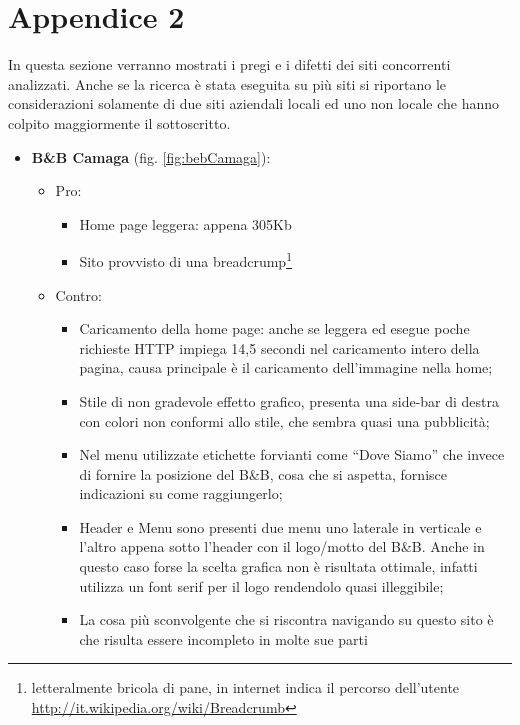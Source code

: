 \documentclass[a4paper,12pt,hidelinks]{report}
\begin{document}
  \section{Appendice 2}
  \label{sec:appendice2}
  In questa sezione verranno mostrati i pregi e i difetti dei siti concorrenti analizzati. Anche se la ricerca è stata eseguita su più siti si riportano le considerazioni
  solamente di due siti aziendali locali ed uno non locale che hanno colpito maggiormente il sottoscritto.
  \begin{itemize}
    \item \textbf{B\&B Camaga} (fig. \ref{fig:bebCamaga}): 
      \begin{itemize}
	\item Pro:
	  \begin{itemize}
	    \item Home page leggera: appena 305Kb
	    \item Sito provvisto di una breadcrump\footnote{letteralmente bricola di pane,
	    in internet indica il percorso dell'utente \url{http://it.wikipedia.org/wiki/Breadcrumb}}
	  \end{itemize}
	\item Contro:
	  \begin{itemize}
	    \item Caricamento della home page: anche se leggera ed esegue poche richieste HTTP impiega 14,5 secondi nel caricamento intero della pagina, causa principale è il 
	    caricamento dell'immagine nella home;
	    \item Stile di non gradevole effetto grafico, presenta una side-bar di destra con colori non conformi allo stile, che sembra quasi una pubblicità;
	    \item Nel menu utilizzate etichette forvianti come ``Dove Siamo'' che invece di fornire la posizione del B\&B, cosa che si aspetta, fornisce indicazioni su come 
	    raggiungerlo;
	    \item Header e Menu sono presenti due menu uno laterale in verticale e l'altro appena sotto l'header con il logo/motto del B\&B. Anche in questo caso forse la scelta 
	    grafica non è risultata ottimale, infatti utilizza un font serif per il logo rendendolo quasi illeggibile;
	    \item La cosa più sconvolgente che si riscontra navigando su questo sito è che risulta essere incompleto in molte sue parti
	  \end{itemize}
	  \begin{figure}[h!]%

\end{figure}
\end{itemize}
\end{itemize}
\end{document}
